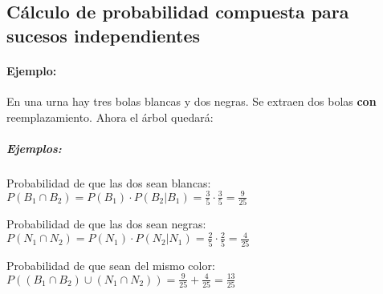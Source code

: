 \subsection{Cálculo de probabilidad compuesta para sucesos independientes}
\paragraph{Ejemplo:} En una urna hay tres bolas blancas y dos negras. Se extraen dos bolas \textbf{con} reemplazamiento. Ahora el árbol quedará:




\subparagraph{Ejemplos:}\begin{list}{-}{}
\item Probabilidad de que las dos sean blancas:\\
$P(B_1\cap B_2)=P(B_1)\cdot P(B_2|B_1)=\frac{3}{5}\cdot\frac{3}{5}=\frac{9}{25}$
\item Probabilidad de que las dos sean negras:\\ 
$P(N_1\cap N_2)=P(N_1)\cdot P(N_2|N_1)=\frac{2}{5}\cdot\frac{2}{5}=\frac{4}{25}$
\item Probabilidad de que sean del mismo color: \\
$P((B_1\cap B_2)\cup (N_1\cap N_2))=\frac{9}{25}+\frac{4}{25}=\frac{13}{25}$
\end{list}

